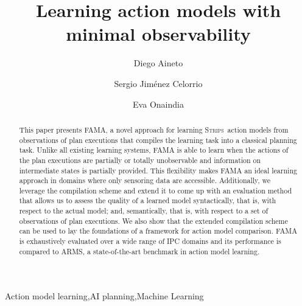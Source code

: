 \documentclass[3p,times]{elsarticle}
\newcommand{\strips}{\textsc{Strips}}     %
\newcommand{\ARMS}{{\small {\sffamily ARMS}}\xspace}
\newcommand{\FAMA}{{\small {\sffamily FAMA}}\xspace}
\begin{document}
\begin{frontmatter}



\dochead{}

\title{Learning action models with minimal observability}
\author[label1]{Diego Aineto}
\author[label1]{Sergio Jim\'{e}nez Celorrio}
\author[label1]{Eva Onaindia}
\address[label1]{Department of Computer Systems and Computation, Universitat Polit\`ecnica de Val\`encia. Spain}




\begin{abstract}
  This paper presents \FAMA, a novel approach for learning \strips\ action models from observations of plan executions that compiles the learning task into a classical planning task. Unlike all existing learning systems, \FAMA is able to learn when the actions of the plan executions are partially or totally unobservable and information on intermediate states is partially provided. This flexibility makes \FAMA an ideal learning approach in domains where only sensoring data are accessible. Additionally, we leverage the compilation scheme and extend it to come up with an evaluation method that allows us to assess the quality of a learned model syntactically, that is, with respect to the actual model; and, semantically, that is, with respect to a set of observations of plan executions. We also show that the extended compilation scheme can be used to lay the foundations of a framework for action model comparison. \FAMA is exhaustively evaluated over a wide range of IPC domains and its performance is compared to \ARMS, a state-of-the-art benchmark in action model learning.
\end{abstract}

\begin{keyword}
Action model learning\sep AI planning\sep Machine Learning

\end{keyword}

\end{frontmatter}
\end{document}
